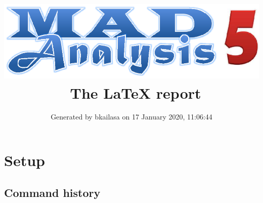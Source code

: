 \documentclass[a4paper, 10pt]{article}
\title{{\includegraphics[scale=.4]{logo.eps}}\ The LaTeX report}
\author{Generated by bkailasa on 17 January 2020, 11:06:44}
\begin{document}
\maketitle
\flushbottom

\newpage
\section{ Setup}

\subsection{ Command history}
\end{document}
